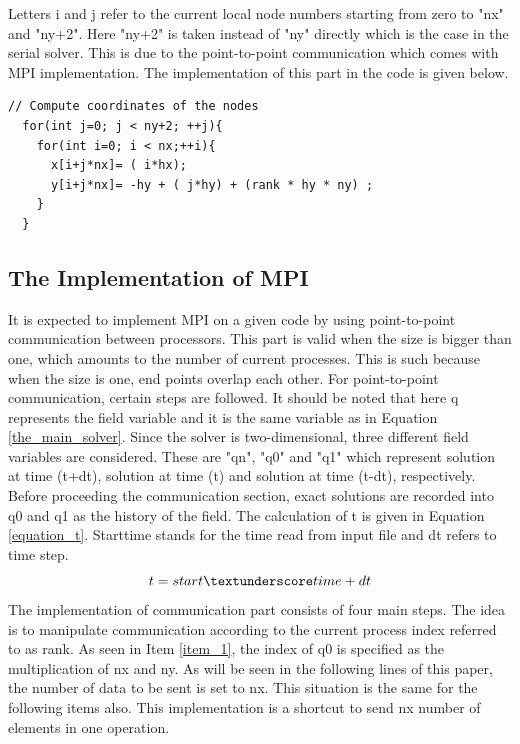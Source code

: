 \documentclass{article}
\begin{document}
Letters i and j refer to the current local node numbers starting from zero to "nx" and "ny+2". Here "ny+2" is taken instead of "ny" directly which is the case in the serial solver. This is due to the point-to-point communication which comes with MPI implementation. The implementation of this part in the code is given below. 
\begin{verbatim}
// Compute coordinates of the nodes
  for(int j=0; j < ny+2; ++j){
    for(int i=0; i < nx;++i){
      x[i+j*nx]= ( i*hx); 
      y[i+j*nx]= -hy + ( j*hy) + (rank * hy * ny) ;
    }
  }
\end{verbatim}
\subsection{The Implementation of MPI}
It is expected to implement MPI on a given code by using point-to-point communication between processors. This part is valid when the size is bigger than one, which amounts to the number of current processes. This is such because when the size is one, end points overlap each other. For point-to-point communication, certain steps are followed. It should be noted that here q represents the field variable and it is the same variable as in Equation \ref{the_main_solver}. Since the solver is two-dimensional, three different field variables are considered. These are "qn", "q0" and "q1" which represent solution at time (t+dt), solution at time (t) and solution at time (t-dt), respectively. Before proceeding the communication section, exact solutions are recorded into q0 and q1 as the history of the field. The calculation of t is given in Equation \ref{equation_t}. Start\textunderscore time stands for the time read from input file and dt refers to time step. 
\begin{equation} %
    t = start\textunderscore time + dt
    \label{equation_t}
\end{equation}
The implementation of communication part consists of four main steps. The idea is to manipulate communication according to the current process index referred to as rank. As seen in Item \ref{item_1}, the index of q0 is specified as the multiplication of nx and ny. As will be seen in the following lines of this paper, the number of data to be sent is set to nx. This situation is the same for the following items also. This implementation is a shortcut to send nx number of elements in one operation. \\
\end{document}
